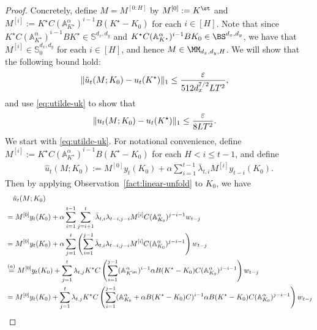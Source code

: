 \begin{proof}
Concretely, define $M = M^{[0:H]}$ by $M^{[0]} := K^\st$ and $M^{[i]} := K^{\star}C(\mathbb{A}_{K^{\star}}^{\alpha})^{i-1}B(K^{\star}-K_0)$ for each $i \in [H]$. Note that since $K^{\star}C(\mathbb{A}_{K^{\star}}^{\alpha})^{i-1}BK^{\star}\in\mathbb{S}^{d_x, d_y}$ and $ K^{\star}C(\mathbb{A}_{K^{\star}}^{\alpha})^{i-1}BK_0 \in \BS^{d_x,d_y}$, we have that $M^{[i]}\in\mathbb{S}_{0}^{d_x,d_y}$ for each $i \in [H]$, and hence $M\in \MM_{d_x,d_y,H}$. We will show that the following bound hold:
\begin{align}
\|\tilde{u}_t(M;K_0)-u_t(K^{\star})\|_1&\le \frac{\varepsilon}{512d_x^{7/2}LT^2}, \label{eq:utilde-uk}
\end{align}
and use \cref{eq:utilde-uk} to show that
\begin{align}
\|u_t(M;K_0)-u_t(K^{\star})\|_1&\le \frac{\varepsilon}{8LT^2}\label{eq:u-uk}.
\end{align}
We start with \cref{eq:utilde-uk}. For notational convenience, define $M^{[i]} := K^{\star}C(\mathbb{A}_{K^{\star}}^{\alpha})^{i-1}B(K^{\star}-K_0)$ for each $H<i\le t-1$, and define
\begin{align*}
\hat{u}_{t}(M;K_0):=M^{[0]}y_t(K_0)+\alpha\sum_{i=1}^{t-1}\bar{\lambda}_{t,i}M^{[i]}y_{t-i}(K_0).
\end{align*}
Then by applying Observation~\ref{fact:linear-unfold} to $K_0$, we have
\begin{align*}
& \quad \hat{u}_{t}(M;K_0) \\
&=M^{[0]}y_t(K_0)+\alpha\sum_{i=1}^{t-1}\sum_{j=i+1}^{t}\bar{\lambda}_{t,i}\lambda_{t-i,j-i}M^{[i]}C(\mathbb{A}_{K_{0}}^{\alpha})^{j-i-1}w_{t-j}\\
&=M^{[0]}y_t(K_0)+\alpha\sum_{j=1}^{t}\left(\sum_{i=1}^{j-1}\bar{\lambda}_{t,i}\lambda_{t-i,j-i}M^{[i]}C(\mathbb{A}_{K_{0}}^{\alpha})^{j-i-1}\right)w_{t-j}\\
&\overset{(a)}{=} M^{[0]}y_t(K_0)+\sum_{j=1}^{t}\lambda_{t,j}K^{\star}C\left(\sum_{i=1}^{j-1}(\mathbb{A}_{K^\st}^{\alpha})^{i-1}\alpha B(K^{\star}-K_0)C(\mathbb{A}_{K_{0}}^{\alpha})^{j-i-1}\right)w_{t-j}\\
&=M^{[0]}y_t(K_0)+\sum_{j=1}^{t}\lambda_{t,j}K^{\star}C\left(\sum_{i=1}^{j-1}(\mathbb{A}_{K_{0}}^{\alpha}+\alpha B(K^{\star}-K_0)C)^{i-1}\alpha B(K^{\star}-K_0)C(\mathbb{A}_{K_{0}}^{\alpha})^{j-i-1}\right)w_{t-j}\\

\end{align*}
\end{proof}
